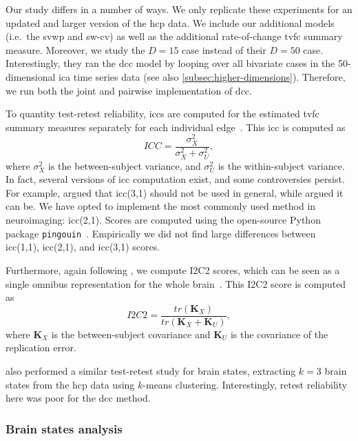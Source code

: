 Our study differs in a number of ways.
We only replicate these experiments for an updated and larger version of the \gls{hcp} data.
We include our additional models (i.e.~the \gls{svwp} and \gls{sw-cv}) as well as the additional rate-of-change \gls{tvfc} summary measure.
Moreover, we study the $D = 15$ case instead of their $D = 50$ case.
Interestingly, they ran the \gls{dcc} model by looping over all bivariate cases in the 50-dimensional \gls{ica} time series data (see also \cref{subsec:higher-dimensions}).
Therefore, we run both the joint and pairwise implementation of \gls{dcc}.

To quantity test-retest reliability, \glspl{icc} are computed for the estimated \gls{tvfc} summary measures separately for each individual edge~\parencite{Shrout1979, Chen2018}.
This \gls{icc} is computed as
\begin{equation}
  ICC = \frac{\sigma_X^2}{\sigma_X^2 + \sigma_U^2},
  \label{eq:icc}
\end{equation}
where $\sigma_X^2$ is the between-subject variance, and $\sigma_U^2$ is the within-subject variance.
%
In fact, several versions of \gls{icc} computation exist, and some controversies persist.
For example, \textcite{Noble2019} argued that \gls{icc}(3,1) should not be used in general, while \textcite{Chen2018} argued it can be.
We have opted to implement the most commonly used method in neuroimaging: \gls{icc}(2,1).
Scores are computed using the open-source Python package \texttt{pingouin}~\parencite[][version 0.5.2]{Vallat2018}.
Empirically we did not find large differences between \gls{icc}(1,1), \gls{icc}(2,1), and \gls{icc}(3,1) scores.

Furthermore, again following \textcite{Choe2017}, we compute I2C2 scores, which can be seen as a single omnibus representation for the whole brain~\parencite{Shou2013}.
This I2C2 score is computed as
\begin{equation}
  I2C2 = \frac{tr(\mathbf{K}_X)}{tr(\mathbf{K}_X + \mathbf{K}_U)},
  \label{eq:i2c2}
\end{equation}
where $\mathbf{K}_X$ is the between-subject covariance and $\mathbf{K}_U$ is the covariance of the replication error.

\textcite{Choe2017} also performed a similar test-retest study for brain states, extracting $k = 3$ brain states from the \gls{hcp} data using $k$-means clustering.
Interestingly, retest reliability here was poor for the \gls{dcc} method.

\subsubsection{Brain states analysis}

